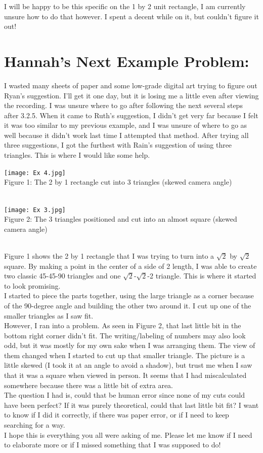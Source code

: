 \documentclass{article}
\begin{document}
I will be happy to be this specific on the 1 by 2 unit rectangle, I am currently unsure how to do that however. I spent a decent while on it, but couldn't figure it out!\\

\section*{Hannah's Next Example Problem:}
I wasted many sheets of paper and some low-grade digital art trying to figure out Ryan's suggestion. I'll get it one day, but it is losing me a little even after viewing the recording. I was unsure where to go after following the next several steps after 3.2.5. When it came to Ruth's suggestion, I didn't get very far because I felt it was too similar to my previous example, and I was unsure of where to go as well because it didn't work last time I attempted that method. After trying all three suggestions, I got the furthest with Rain's suggestion of using three triangles.
This is where I would like some help.

\texttt{[image: Ex 4.jpg]}\\
\caption{Figure 1: The 2 by 1 rectangle cut into 3 triangles (skewed camera angle)}\\

\texttt{[image: Ex 3.jpg]}\\
\caption{Figure 2: The 3 triangles positioned and cut into an almost square (skewed camera angle)}\\

Figure 1 shows the 2 by 1 rectangle that I was trying to turn into a $\sqrt{2}$ by $\sqrt{2}$ square. By making a point in the center of a side of 2 length, I was able to create two classic 45-45-90 triangles and one $\sqrt{2}$-$\sqrt{2}$-2 triangle. This is where it started to look promising.\\
I started to piece the parts together, using the large triangle as a corner because of the 90-degree angle and building the other two around it. I cut up one of the smaller triangles as I saw fit.\\
However, I ran into a problem. As seen in Figure 2, that last little bit in the bottom right corner didn't fit. The writing/labeling of numbers may also look odd, but it was mostly for my own sake when I was arranging them. The view of them changed when I started to cut up that smaller triangle. The picture is a little skewed (I took it at an angle to avoid a shadow), but trust me when I saw that it was a square when viewed in person. It seems that I had miscalculated somewhere because there was a little bit of extra area.\\
The question I had is, could that be human error since none of my cuts could have been perfect? If it was purely theoretical, could that last little bit fit? I want to know if I did it correctly, if there was paper error, or if I need to keep searching for a way.\\
I hope this is everything you all were asking of me. Please let me know if I need to elaborate more or if I missed something that I was supposed to do!
\end{document}
